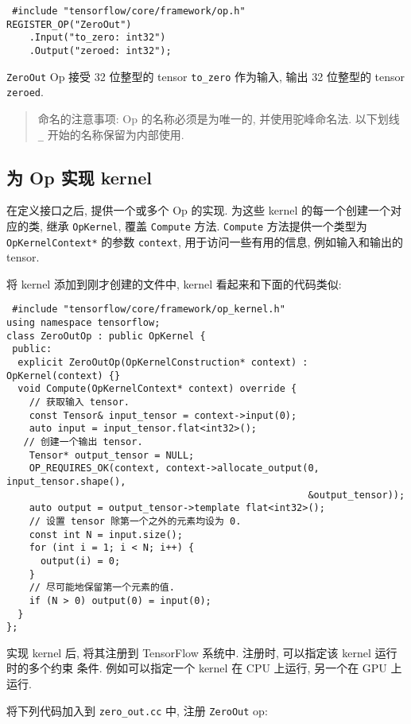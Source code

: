 \begin{verbatim}
 #include "tensorflow/core/framework/op.h"
REGISTER_OP("ZeroOut")
    .Input("to_zero: int32")
    .Output("zeroed: int32");
\end{verbatim}

\texttt{ZeroOut} Op 接受 32 位整型的 tensor \texttt{to\_zero} 作为输入,
输出 32 位整型的 tensor \texttt{zeroed}.

\begin{quote}
命名的注意事项: Op 的名称必须是为唯一的, 并使用驼峰命名法. 以下划线
\texttt{\_} 开始的名称保留为内部使用.
\end{quote}

\subsection{为 Op 实现 kernel }\label{ux4e3a-op-ux5b9eux73b0-kernel}

在定义接口之后, 提供一个或多个 Op 的实现. 为这些 kernel
的每一个创建一个对应的类, 继承 \texttt{OpKernel}, 覆盖 \texttt{Compute}
方法. \texttt{Compute} 方法提供一个类型为 \texttt{OpKernelContext*}
的参数 \texttt{context}, 用于访问一些有用的信息, 例如输入和输出的
tensor.

将 kernel 添加到刚才创建的文件中, kernel 看起来和下面的代码类似:

\begin{verbatim}
 #include "tensorflow/core/framework/op_kernel.h"
using namespace tensorflow;
class ZeroOutOp : public OpKernel {
 public:
  explicit ZeroOutOp(OpKernelConstruction* context) : OpKernel(context) {}
  void Compute(OpKernelContext* context) override {
    // 获取输入 tensor.
    const Tensor& input_tensor = context->input(0);
    auto input = input_tensor.flat<int32>();
   // 创建一个输出 tensor.
    Tensor* output_tensor = NULL;
    OP_REQUIRES_OK(context, context->allocate_output(0, input_tensor.shape(),
                                                     &output_tensor));
    auto output = output_tensor->template flat<int32>();
    // 设置 tensor 除第一个之外的元素均设为 0.
    const int N = input.size();
    for (int i = 1; i < N; i++) {
      output(i) = 0;
    }
    // 尽可能地保留第一个元素的值.
    if (N > 0) output(0) = input(0);
  }
};
\end{verbatim}

实现 kernel 后, 将其注册到 TensorFlow 系统中. 注册时, 可以指定该 kernel
运行时的多个约束 条件. 例如可以指定一个 kernel 在 CPU 上运行, 另一个在
GPU 上运行.

将下列代码加入到 \texttt{zero\_out.cc} 中, 注册 \texttt{ZeroOut} op:

